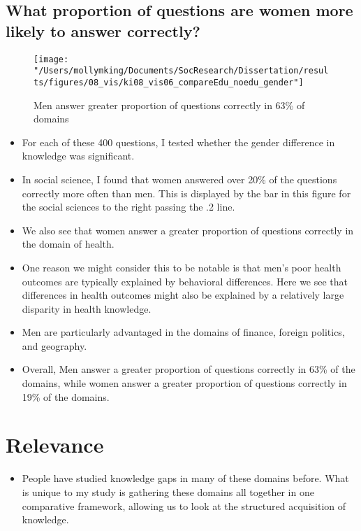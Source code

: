 \documentclass[]{article}
\begin{document}
\newpage
\subsection{What proportion of questions are women more likely to answer correctly?}
\begin{figure}[ht]
    \begin{center}
      \texttt{[image: "/Users/mollymking/Documents/SocResearch/Dissertation/results/figures/08\_vis/ki08\_vis06\_compareEdu\_noedu\_gender"]}
      \caption{Men answer greater proportion of questions correctly in 63\% of domains}
    \end{center}
\end{figure}

\begin{itemize}
  \item{For each of these 400 questions, I tested whether the gender difference in knowledge was significant.}
  \item{In social science, I found that women answered over 20\% of the questions correctly more often than men. This is displayed by the bar in this figure for the social sciences to the right passing the .2 line.}
  \item{We also see that women answer a greater proportion of questions correctly in the domain of health.}
  \item{One reason we might consider this to be notable is that men's poor health outcomes are typically explained by behavioral differences. Here we see that differences in health outcomes might also be explained by a relatively large disparity in health knowledge.}
  \item{Men are particularly advantaged in the domains of finance, foreign politics, and geography.}
  \item{Overall, Men answer a greater proportion of questions correctly in 63\% of the domains, while women answer a greater proportion of questions correctly in 19\% of the domains.}
\end{itemize}

\newpage
\section{Relevance}

\begin{itemize}
  \item{People have studied knowledge gaps in many of these domains before. What is unique to my study is gathering these domains all together in one comparative framework, allowing us to look at the structured acquisition of knowledge.}
\end{itemize}
\end{document}
